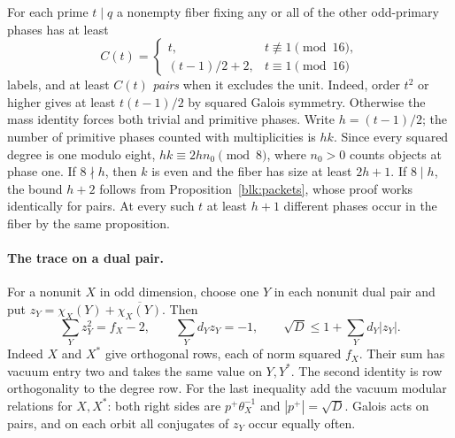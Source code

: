 \documentclass[11pt]{amsart}
\numberwithin{equation}{section}
\theoremstyle{definition}
\theoremstyle{plain}
\begin{document}
For each prime $t\mid q$ a nonempty fiber fixing any or all of the other
odd-primary phases has at least
\[
 C(t)=\begin{cases}t,&t\not\equiv1\pmod{16},\\
 (t-1)/2+2,&t\equiv1\pmod{16}\end{cases}
\]
labels, and at least $C(t)$ \emph{pairs} when it excludes the unit.
Indeed, order $t^2$ or higher gives at least $t(t-1)/2$ by squared
Galois symmetry. Otherwise the mass identity forces both trivial and
primitive phases. Write $h=(t-1)/2$; the number of primitive phases
counted with multiplicities is $hk$. Since every squared degree is
one modulo eight, $hk\equiv2h n_0\pmod8$, where $n_0>0$ counts
objects at phase one. If $8\nmid h$, then $k$ is even and the fiber
has size at least $2h+1$. If $8\mid h$, the bound $h+2$ follows
from Proposition~\ref{blk:packets}, whose proof works identically for
pairs. At every such $t$ at least $h+1$ different phases occur in
the fiber by the same proposition.

\paragraph{The trace on a dual pair.}
For a nonunit $X$ in odd dimension, choose one $Y$ in each nonunit dual
pair and put $z_Y=\chi_X(Y)+\overline{\chi_X(Y)}$. Then
\[
 \sum_Y z_Y^2=f_X-2,\qquad
 \sum_Y d_Yz_Y=-1,\qquad
 \sqrt D\le1+\sum_Y d_Y|z_Y|.
\]
Indeed $X$ and $X^*$ give orthogonal rows, each of norm squared $f_X$.
Their sum has vacuum entry two and takes the same value on $Y,Y^*$.
The second identity is row orthogonality to the degree row. For the
last inequality add the vacuum modular relations for $X,X^*$: both
right sides are $p^+\theta_X^{-1}$ and $|p^+|=\sqrt D$. Galois acts
on pairs, and on each orbit all conjugates of $z_Y$ occur equally often.
\end{document}
